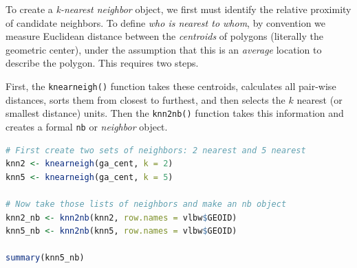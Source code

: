 \documentclass[
]{book}
\newcommand{\passthrough}[1]{#1}
\begin{document}
To create a \emph{k-nearest neighbor} object, we first must identify the relative proximity of candidate neighbors. To define \emph{who is nearest to whom}, by convention we measure Euclidean distance between the \emph{centroids} of polygons (literally the geometric center), under the assumption that this is an \emph{average} location to describe the polygon. This requires two steps.

First, the \passthrough{\lstinline!knearneigh()!} function takes these centroids, calculates all pair-wise distances, sorts them from closest to furthest, and then selects the \(k\) nearest (or smallest distance) units. Then the \passthrough{\lstinline!knn2nb()!} function takes this information and creates a formal \passthrough{\lstinline!nb!} or \emph{neighbor} object.

\begin{lstlisting}[language=R]
# First create two sets of neighbors: 2 nearest and 5 nearest
knn2 <- knearneigh(ga_cent, k = 2)
knn5 <- knearneigh(ga_cent, k = 5)

# Now take those lists of neighbors and make an nb object
knn2_nb <- knn2nb(knn2, row.names = vlbw$GEOID)
knn5_nb <- knn2nb(knn5, row.names = vlbw$GEOID)

summary(knn5_nb)
\end{lstlisting}
\end{document}
